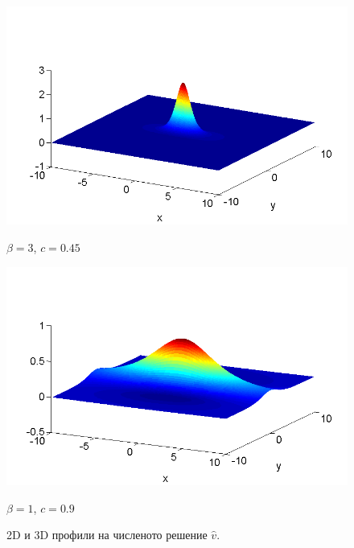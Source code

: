 \documentclass{beamer}
\begin{document}
\begin{frame}
\begin{figure}[ht]
	\begin{minipage}[b]{0.45\linewidth}
		 \raggedleft
		\includegraphics[width=\linewidth]{../Thesis/SolutionView/ChristovIC_30_bt3_c045_prpview.png}		
		\centerline{$\beta = 3$, $c = 0.45$ }
	\end{minipage}
	\begin{minipage}[b]{0.45\linewidth}
		 \raggedright
		\includegraphics[width=\linewidth]{../Thesis/SolutionView/ChristovIC_128_bt1_c090_prpview.png}
		\centerline{$\beta = 1$, $c = 0.9$}
	\end{minipage}
	\caption{2D и 3D профили на численото решение $\widehat v$.}
	\label{fig:solutions}
\end{figure}

\end{frame}

\end{document}
